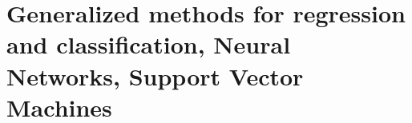 \section*{Generalized methods for regression and classification, Neural Networks, Support Vector Machines}